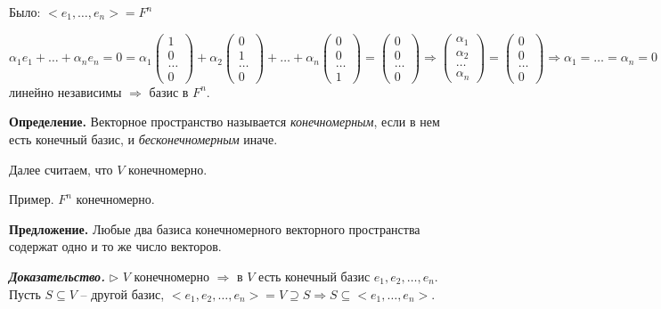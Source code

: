 Было: $<e_1, \dots, e_n> = F^n$

$\alpha_1 e_1 + \dots + \alpha_n e_n = 0 = \alpha_1 \begin{pmatrix} 1 \\ 0 \\ \dots \\ 0  \end{pmatrix} + \alpha_2 \begin{pmatrix} 0 \\ 1 \\ \dots \\ 0  \end{pmatrix} + \dots + \alpha_n \begin{pmatrix} 0 \\ 0 \\ \dots \\ 1 \end{pmatrix} = \begin{pmatrix} 0 \\ 0 \\ \dots \\ 0  \end{pmatrix} \Rightarrow \begin{pmatrix} \alpha_1 \\ \alpha_2 \\ \dots \\ \alpha_n  \end{pmatrix} = \begin{pmatrix} 0 \\ 0 \\ \dots \\ 0  \end{pmatrix} \Rightarrow \alpha_1 = \dots = \alpha_n = 0 \Rightarrow e_1, \dots, e_n$ линейно независимы $\Rightarrow$ базис в $F^n$.

\vspace{\baselineskip}
\textbf{Определение.} Векторное пространство называется \textit{конечномерным}, если в нем есть конечный базис, и \textit{бесконечномерным} иначе.

Далее считаем, что $V$ конечномерно. 

\vspace{\baselineskip}
Пример. $F^n$ конечномерно.

\vspace{\baselineskip}
\textbf{Предложение.} Любые два базиса конечномерного векторного пространства содержат одно и то же число векторов.

\vspace{\baselineskip}
\textbf{\textit{Доказательство.}} $\rhd$ $V$ конечномерно $\Rightarrow$ в $V$ есть конечный базис $e_1, e_2, \dots, e_n$. Пусть $S \subseteq V$ -- другой базис, $<e_1, e_2, \dots, e_n> = V \supseteq S \Rightarrow S \subseteq <e_1, \dots, e_n>$.

